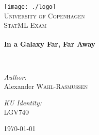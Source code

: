 \begin{titlepage}
\begin{center}

\texttt{[image: ./logo]}~\\[1cm]

\textsc{\LARGE University of Copenhagen}\\[1.5cm]

\textsc{\Large StatML Exam}\\[0.5cm]

\HRule \\[0.4cm]
{ \huge \bfseries In a Galaxy Far, Far Away \\[0.4cm] }

\HRule \\[1.5cm]

\begin{minipage}{0.45\textwidth}
\begin{flushleft} \large
\emph{Author:}\\
Alexander \textsc{Wahl-Rasmussen}
\end{flushleft}
\end{minipage}
\begin{minipage}{0.45\textwidth}
\begin{flushright} \large
\emph{KU Identity:} \\
\textsc{LGV740}
\end{flushright}
\end{minipage}

\vfill

{\large \today}

\end{center}
\end{titlepage}